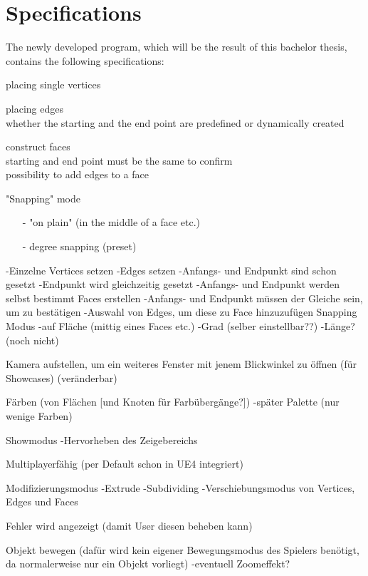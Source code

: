 \documentclass{report}
\begin{document}
\chapter{Specifications}
	The newly developed program, which will be the result of this bachelor thesis, contains the following specifications:
	\begin{description}
		\item placing single vertices
		\item placing edges \\
			whether the starting and the end point are predefined or dynamically created
		\item construct faces \\
			starting and end point must be the same to confirm \\
			possibility to add edges to a face
		\item "Snapping" mode \\
			\begin{itemize}
				\setlength{\itemsep}{0pt}
				\item[-] "on plain" (in the middle of a face etc.) \\
				\item[-] degree snapping (preset)
			\end{itemize}
	\end{description}
	-Einzelne Vertices setzen
	-Edges setzen
		-Anfangs- und Endpunkt sind schon gesetzt
		-Endpunkt wird gleichzeitig gesetzt
		-Anfangs- und Endpunkt werden selbst bestimmt
	Faces erstellen
		-Anfangs- und Endpunkt müssen der Gleiche sein, um zu bestätigen
		-Auswahl von Edges, um diese zu Face hinzuzufügen
	Snapping Modus
		-auf Fläche (mittig eines Faces etc.)
		-Grad (selber einstellbar??)
		-Länge? (noch nicht)
	
	Kamera aufstellen, um ein weiteres Fenster mit jenem Blickwinkel zu öffnen (für Showcases) (veränderbar)
	
	Färben (von Flächen [und Knoten für Farbübergänge?])
		-später Palette (nur wenige Farben)
	
	Showmodus
		-Hervorheben des Zeigebereichs
		
	Multiplayerfähig (per Default schon in UE4 integriert)
	
	Modifizierungsmodus
		-Extrude
		-Subdividing
		-Verschiebungsmodus von Vertices, Edges und Faces
	
	Fehler wird angezeigt (damit User diesen beheben kann)
		
	Objekt bewegen (dafür wird kein eigener Bewegungsmodus des Spielers benötigt, da normalerweise nur ein Objekt vorliegt)
		-eventuell Zoomeffekt?
		
\end{document}
